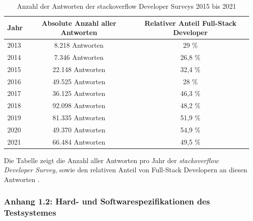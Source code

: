 \documentclass[a4paper]{scrartcl}
\begin{document}
\begin{table}[H]
	\centering
	\caption{Anzahl der Antworten der stackoverflow Developer Surveys 2015 bis 2021}
	\begin{center}
		\begin{tabular}{| l | c | c |}
			\hline
			Jahr & Absolute Anzahl aller Antworten & Relativer Anteil Full-Stack Developer \\
			\hline \hline
			2013 & 8.218 Antworten & 29 \% \\
			\hline
			2014 & 7.346 Antworten & 26,8 \% \\
			\hline
			2015 & 22.148 Antworten & 32,4 \% \\
			\hline 
			2016 & 49.525 Antworten & 28 \% \\
			\hline 
			2017 & 36.125 Antworten & 46,3 \% \\
			\hline 
			2018 & 92.098 Antworten & 48,2 \% \\
			\hline
			2019 & 81.335 Antworten & 51,9 \% \\
			\hline
			2020 & 49.370 Antworten & 54,9 \% \\
			\hline
			2021 & 66.484 Antworten & 49,5 \% \\
			\hline
		\end{tabular}
	\end{center}
	Die Tabelle zeigt die Anzahl aller Antworten pro Jahr der \textit{stackoverflow Developer Survey}, sowie den relativen Anteil von Full-Stack Developern an diesen Antworten \autocite{stackoverflow_2015,stackoverflow_2016,stackoverflow_2017,stackoverflow_2018,stackoverflow_2019,stackoverflow_2020,stackoverflow_2021}.
\end{table}

\newpage

\subsubsection*{Anhang 1.2: Hard- und Softwarespezifikationen des Testsystemes}
\end{document}
